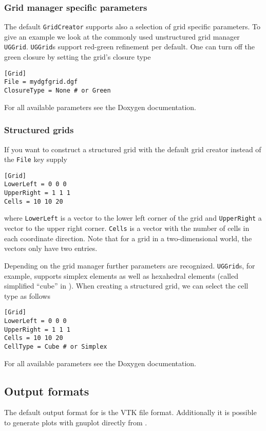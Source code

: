 \subsubsection{Grid manager specific parameters}
The default \texttt{GridCreator} supports also a selection of grid specific parameters.
To give an example we look at the commonly used unstructured grid manager \texttt{UGGrid}.
\texttt{UGGrid}s support red-green refinement per default. One can turn off the green closure by setting the grid's closure type
\begin{lstlisting}[style=DumuxParameterFile]
[Grid]
File = mydgfgrid.dgf
ClosureType = None # or Green
\end{lstlisting}
For all available parameters see the Doxygen documentation.

\subsubsection{Structured grids}
If you want to construct a structured grid with the default grid creator instead of the \texttt{File} key supply
\begin{lstlisting}[style=DumuxParameterFile]
[Grid]
LowerLeft = 0 0 0
UpperRight = 1 1 1
Cells = 10 10 20
\end{lstlisting}
where \texttt{LowerLeft} is a vector to the lower left corner of the grid and \texttt{UpperRight} a vector to the upper right corner.
\texttt{Cells} is a vector with the number of cells in each coordinate direction. Note that for a grid in a two-dimensional world, the
vectors only have two entries.

Depending on the grid manager further parameters are recognized.
\texttt{UGGrid}s, for example, supports simplex elements as well as hexahedral elements
(called simplified ``cube'' in \Dune). When creating a structured grid, we can select the cell type as follows
\begin{lstlisting}[style=DumuxParameterFile]
[Grid]
LowerLeft = 0 0 0
UpperRight = 1 1 1
Cells = 10 10 20
CellType = Cube # or Simplex
\end{lstlisting}
For all available parameters see the Doxygen documentation.


\subsection{Output formats}
The default output format for \Dumux is the VTK file format. Additionally it is possible 
to generate plots with gnuplot directly from \Dumux.

